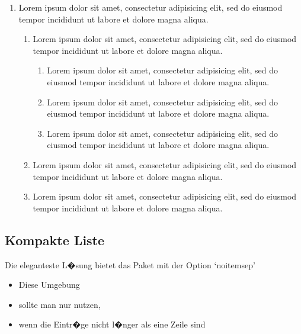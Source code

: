 \begin{enumerate}
   \item Lorem ipsum dolor sit amet, consectetur adipisicing elit, sed do eiusmod tempor
         incididunt ut labore et dolore magna aliqua.
         \begin{enumerate}
            \item Lorem ipsum dolor sit amet, consectetur adipisicing elit, sed do eiusmod tempor
                  incididunt ut labore et dolore magna aliqua.
                  \begin{enumerate}
                     \item Lorem ipsum dolor sit amet, consectetur adipisicing elit, sed do eiusmod tempor
                           incididunt ut labore et dolore magna aliqua.
                     \item Lorem ipsum dolor sit amet, consectetur adipisicing elit, sed do eiusmod tempor
                           incididunt ut labore et dolore magna aliqua.
                     \item Lorem ipsum dolor sit amet, consectetur adipisicing elit, sed do eiusmod tempor
                           incididunt ut labore et dolore magna aliqua.
                  \end{enumerate}
            \item Lorem ipsum dolor sit amet, consectetur adipisicing elit, sed do eiusmod tempor
                  incididunt ut labore et dolore magna aliqua.
            \item Lorem ipsum dolor sit amet, consectetur adipisicing elit, sed do eiusmod tempor
                  incididunt ut labore et dolore magna aliqua.
         \end{enumerate}
\end{enumerate}

%
\subsection{Kompakte Liste}

Die eleganteste L�sung bietet das Paket  mit der Option
`noitemsep'
\begin{itemize}[noitemsep]
   \item Diese Umgebung
   \item sollte man nur nutzen,
   \item wenn die Eintr�ge nicht l�nger als eine Zeile sind
\end{itemize}

